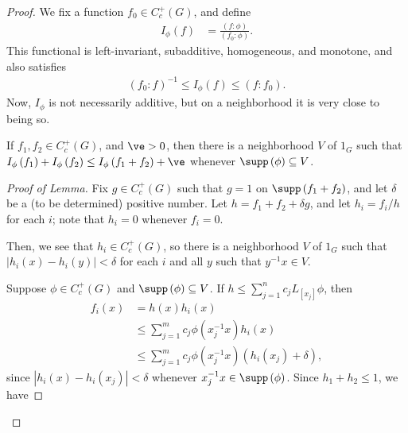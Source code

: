 \documentclass[10pt]{mypackage}
\begin{document}
\begin{proof}
  We fix a function $f_0\in C_c^{+}\left( G \right)$, and define
  \begin{align*}
    I_{\phi}\left( f \right) &= \frac{\left( f:\phi \right)}{\left( f_0:\phi \right)}.
  \end{align*}
  This functional is left-invariant, subadditive, homogeneous, and monotone, and also satisfies
  \begin{align*}
    \left( f_0:f \right)^{-1}\leq I_{\phi}\left( f \right)\leq \left( f:f_0 \right).
  \end{align*}
  Now, $I_{\phi}$ is not necessarily additive, but on a neighborhood it is very close to being so.
  \begin{lemma}
    If $f_1,f_2\in C_c^{+}\left( G \right)$, and $\ve > 0$, then there is a neighborhood $V$ of $1_G$ such that $I_{\phi}\left( f_1 \right) + I_{\phi}\left( f_2 \right) \leq I_{\phi}\left( f_1 + f_2 \right) + \ve$ whenever $\supp\left( \phi \right)\subseteq V$.
  \end{lemma}
  \begin{proof}[Proof of Lemma]
    Fix $g\in C_c^{+}\left( G \right)$ such that $g = 1$ on $\supp\left( f_1 + f_2 \right)$, and let $\delta$ be a (to be determined) positive number. Let $h = f_1 + f_2 + \delta g$, and let $h_i = f_i/h$ for each $i$; note that $h_i = 0$ whenever $f_i = 0$.\newline

    Then, we see that $h_i\in C_c^{+}\left( G \right)$, so there is a neighborhood $V$ of $1_G$ such that $\left\vert h_i\left( x \right) - h_i\left( y \right) \right\vert < \delta$ for each $i$ and all $y$ such that $y^{-1}x\in V$.\newline

    Suppose $\phi\in C_c^{+}\left( G \right)$ and $\supp\left( \phi \right) \subseteq V$. If $h\leq \sum_{j=1}^{n}c_jL_[x_j]\phi$, then
    \begin{align*}
      f_i(x) &= h(x)h_i(x)\\
             &\leq \sum_{j=1}^{m} c_j\phi\left( x_j^{-1}x \right)h_i(x)\\
             &\leq \sum_{j=1}^{m}c_j\phi\left( x_j^{-1}x \right)\left( h_i\left( x_j \right) + \delta \right),
    \end{align*}
    since $\left\vert h_i(x)-h_i\left( x_j \right) \right\vert < \delta$ whenever $x_j^{-1}x\in \supp\left( \phi \right)$. Since $h_1 + h_2 \leq 1$, we have
  \end{proof}
\end{proof}
\end{document}
